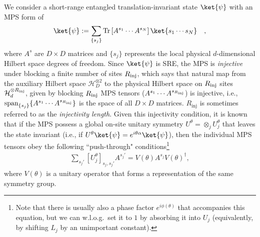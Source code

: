 \documentclass[prx,letterpaper,aps,superscriptaddress,floatfix,twocolumn,nofootinbib]{revtex4-2}
\theoremstyle{definition}
\begin{document}
%
We consider a short-range entangled translation-invariant state $\ket{\psi}$ with an MPS form of
\begin{align}
    \ket{\psi}:=\sum_{\{s_j\}}\mathrm{Tr}\left[A^{s_1} \cdots A^{s_N}\right]\ket{s_1 \cdots s_N}\quad,
    \label{eq:MPSform}
\end{align}
where $A^{s}$ are $D\times D$ matrices and $\{s_j\}$ represents the local physical $d$-dimensional Hilbert space degrees of freedom.
%
Since $\ket{\psi}$ is SRE, the MPS is \textit{injective}~\cite{Perez-Garcia2007} under blocking a finite number of sites ${R_{\rm inj}}$, which says that natural map from the auxiliary Hilbert space $\mathcal{H}^{\otimes 2}_D$ to the physical Hilbert space on $R_{\rm inj}$ sites $\mathcal{H}^{\otimes R_{\rm inj}}_{d}$, given by blocking ${R_{\rm inj}}$ MPS tensors ($A^{s_1} \cdots A^{s_{R_{\rm inj}}}$) is injective, i.e., $\textrm{span}_{\{s_j\}}\{A^{s_1} \cdots A^{s_{R_{\rm inj}}}\}$ is the space of all $D \times D$ matrices.
%
$R_{\text{inj}}$ is sometimes referred to as the \textit{injectivity length}.
%
Given this injectivity condition, it is known that if the MPS possess a global on-site unitary symmetry $U^\theta = \otimes_j U^\theta_j$ that leaves the state invariant (i.e., if $U^\theta\ket{\psi}=e^{i\theta \alpha}\ket{\psi}$), then the individual MPS tensors obey the following ``push-through" conditions\footnote{Note that there is usually also a phase factor $e^{i\phi(\theta)}$ that accompanies this equation, but we can  w.l.o.g.\ set it to $1$ by absorbing it into $U_j$ (equivalently, by shifting $L_j$ by an unimportant constant).}
\begin{align}
    \sum_{s_j'}\left[U_{j}^{\theta}\right]_{s_j, s_j'}A^{s_j'}= V(\theta)A^{s_j} V(\theta)^{\dagger},
    \label{eq:pushthrough}
\end{align}
where $V(\theta)$ is a unitary operator that forms a representation of the same symmetry group.
%
\end{document}
